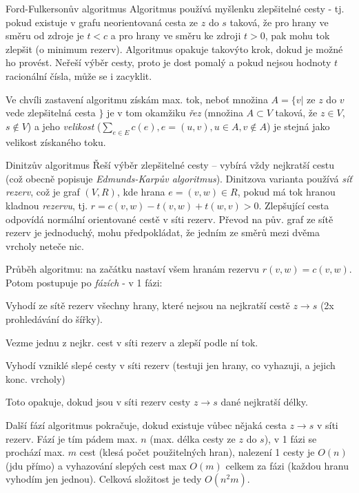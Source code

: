\begin{algoritmusN}{Ford-Fulkersonův algoritmus}
Algoritmus používá myšlenku zlepšitelné cesty - tj. pokud existuje v grafu neorientovaná cesta ze $z$ do $s$ taková, že pro hrany ve směru od zdroje je $t<c$ a pro hrany ve směru ke zdroji $t>0$, pak mohu tok zlepšit (o minimum rezerv). Algoritmus opakuje takovýto krok, dokud je možné ho provést. Neřeší výběr cesty, proto je dost pomalý a pokud nejsou hodnoty $t$ racionální čísla, může se i zacyklit.

Ve chvíli zastavení algoritmu získám max. tok, neboť množina $A=\{ v|$ ze $z$ do $v$ vede zlepšitelná cesta $\}$ je v tom okamžiku \emph{řez} (množina $A\subset V$ taková, že $z\in V$, $s\notin V$) a jeho \emph{velikost} ($\sum_{e\in E}c(e),e=(u,v),u\in A,v\notin A$) je stejná jako velikost získaného toku.
\end{algoritmusN}


\begin{algoritmusN}{Dinitzův algoritmus}
Řeší výběr zlepšitelné cesty -- vybírá vždy nejkratší cestu (což obecně popisuje \emph{Edmunds-Karpův algoritmus}). Dinitzova varianta používá \emph{síť rezerv}, což je graf $(V,R)$, kde hrana $e=(v,w)\in R$, pokud má tok hranou kladnou \emph{rezervu}, tj. $r = c(v,w)-t(v,w)+t(w,v) > 0$. Zlepšující cesta odpovídá normální orientované cestě v síti rezerv. Převod na pův. graf ze sítě rezerv je jednoduchý, mohu předpokládat, že jedním ze směrů mezi dvěma vrcholy neteče nic.

Průběh algoritmu: na začátku nastaví všem hranám rezervu $r(v,w)=c(v,w)$. Potom postupuje po \emph{fázích} - v 1 fázi:
\begin{pitemize}
\item Vyhodí ze sítě rezerv všechny hrany, které nejsou na nejkratší cestě $z\to s$ (2x prohledávání do šířky).
\item Vezme jednu z nejkr. cest v síti rezerv a zlepší podle ní tok.
\item Vyhodí vzniklé slepé cesty v síti rezerv (testuji jen hrany, co vyhazuji, a jejich konc. vrcholy)
\item Toto opakuje, dokud jsou v síti rezerv cesty $z\to s$ dané nejkratší délky.
\end{pitemize}
Další fází algoritmus pokračuje, dokud existuje vůbec nějaká cesta $z\to s$ v síti rezerv. Fází je tím pádem max. $n$ (max. délka cesty ze $z$ do  $s$), v 1 fázi se prochází max. $m$ cest (klesá počet použitelných hran), nalezení 1 cesty je $O(n)$ (jdu přímo) a vyhazování slepých cest max $O(m)$ celkem za fázi (každou hranu vyhodím jen jednou). Celková složitost je tedy $O(n^2 m)$.
\end{algoritmusN}


